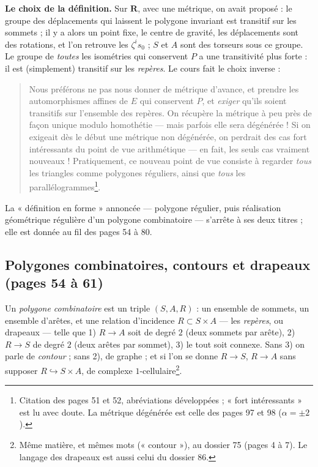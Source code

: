 \documentclass[11pt,a4paper]{article}
\begin{document}
\textbf{Le choix de la définition.} Sur $\mathbf{R}$, avec une métrique, on
avait proposé : le groupe des déplacements qui laissent le polygone invariant
est transitif sur les sommets ; il y a alors un point fixe, le centre de
gravité, les déplacements sont des rotations, et l'on retrouve les $\zeta^i
s_0$ ; $S$ et $A$ sont des torseurs sous ce groupe. Le groupe de \emph{toutes}
les isométries qui conservent $P$ a une transitivité plus forte : il est
(simplement) transitif sur les \emph{repères}. Le cours fait le choix
inverse :
\begin{quote}
Nous préférons ne pas nous donner de métrique d'avance, et prendre les
automorphismes affines de $E$ qui conservent $P$, et \emph{exiger} qu'ils
soient transitifs sur l'ensemble des repères. On récupère la métrique à peu
près de façon unique modulo homothétie --- mais parfois elle sera
dégénérée ! Si on exigeait dès le début une métrique non dégénérée, on
perdrait des cas fort intéressants du point de vue arithmétique --- en fait,
les seuls cas vraiment nouveaux ! Pratiquement, ce nouveau point de vue
consiste à regarder \emph{tous} les triangles comme polygones réguliers, ainsi
que \emph{tous} les parallélogrammes\footnote{Citation des pages 51 et 52,
abréviations développées ; « fort intéressants » est lu avec doute. La
métrique dégénérée est celle des pages 97 et 98 ($\alpha = \pm 2$).}.
\end{quote}
La « définition en forme » annoncée --- polygone régulier, puis réalisation
géométrique régulière d'un polygone combinatoire --- s'arrête à ses deux
titres ; elle est donnée au fil des pages 54 à 80.

\subsection*{Polygones combinatoires, contours et drapeaux (pages 54 à 61)}

Un \emph{polygone combinatoire} est un triple $(S, A, R)$ : un ensemble de
sommets, un ensemble d'arêtes, et une relation d'incidence $R \subset S
\times A$ --- les \emph{repères}, ou drapeaux --- telle que 1) $R \to A$ soit
de degré $2$ (deux sommets par arête), 2) $R \to S$ de degré $2$ (deux arêtes
par sommet), 3) le tout soit connexe. Sans 3) on parle de \emph{contour} ;
sans 2), de graphe ; et si l'on se donne $R \to S$, $R \to A$ sans supposer $R
\hookrightarrow S \times A$, de complexe $1$-cellulaire\footnote{Même matière,
et mêmes mots (« contour »), au dossier 75 (pages 4 à 7). Le langage des
drapeaux est aussi celui du dossier 86.}.
\end{document}
